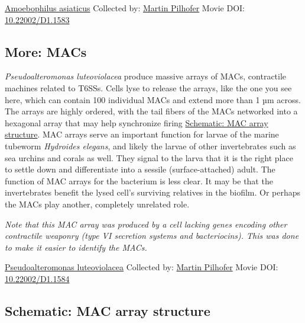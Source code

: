\documentclass[]{tufte-book}
\begin{document}
\hypertarget{htmlwidget-08b4cbd71e2dbe76e4d4}{}

\label{fig:9-7a}\protect\hyperlink{tree}{Amoebophilus asiaticus} Collected by: \protect\hyperlink{martin_pilhofer}{Martin Pilhofer} Movie DOI: \href{https://doi.org/10.22002/D1.1583}{10.22002/D1.1583}

\hypertarget{MACs}{%
\subsection*{More: MACs}\label{MACs}}

\emph{Pseudoalteromonas luteoviolacea} produce massive arrays of MACs, contractile machines related to T6SSs. Cells lyse to release the arrays, like the one you see here, which can contain 100 individual MACs and extend more than 1 µm across. The arrays are highly ordered, with the tail fibers of the MACs networked into a hexagonal array that may help synchronize firing \protect\hyperlink{MAC_array_structure}{Schematic: MAC array structure}. MAC arrays serve an important function for larvae of the marine tubeworm \emph{Hydroides elegans}, and likely the larvae of other invertebrates such as sea urchins and corals as well. They signal to the larva that it is the right place to settle down and differentiate into a sessile (surface-attached) adult. The function of MAC arrays for the bacterium is less clear. It may be that the invertebrates benefit the lysed cell's surviving relatives in the biofilm. Or perhaps the MACs play another, completely unrelated role.

\emph{Note that this MAC array was produced by a cell lacking genes encoding other contractile weaponry (type VI secretion systems and bacteriocins). This was done to make it easier to identify the MACs.}



\hypertarget{htmlwidget-57a6b61c580ae09430a1}{}

\label{fig:9-7b}\protect\hyperlink{tree}{Pseudoalteromonas luteoviolacea} Collected by: \protect\hyperlink{martin_pilhofer}{Martin Pilhofer} Movie DOI: \href{https://doi.org/10.22002/D1.1584}{10.22002/D1.1584}

\hypertarget{MAC_array_structure}{%
\subsection*{Schematic: MAC array structure}\label{MAC_array_structure}}
\end{document}
